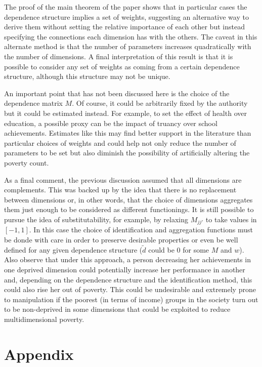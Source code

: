 \documentclass[english, a4paper,12pt]{article}
\begin{document}
The proof of the main theorem of the paper shows that in particular cases the dependence structure implies a set of weights, suggesting an alternative way to derive them without setting the relative importance of each other but instead specifying the connections each dimension has with the others. The caveat in this alternate method is that the number of parameters increases quadratically with the number of dimensions. A final interpretation of this result is that it is possible to consider any set of weights as coming from a certain dependence structure, although this structure may not be unique.

An important point that has not been discussed here is the choice of the dependence matrix $M$. Of course, it could be arbitrarily fixed by the authority but it could be estimated instead. For example, to set the effect of health over education, a possible proxy can be the impact of truancy over school achievements. Estimates like this may find better support in the literature than particular choices of weights and could help not only reduce the number of parameters to be set but also diminish the possibility of artificially altering the poverty count.

As a final comment, the previous discussion assumed that all dimensions are complements. This was backed up by the idea that there is no replacement between dimensions or, in other words, that the choice of dimensions aggregates them just enough to be considered as different functionings. It is still possible to pursue the idea of substitutability, for example, by relaxing $M_{jj'}$ to take values in $[-1,1]$. In this case the choice of identification and aggregation functions must be donde with care in order to preserve desirable properties or even be well defined for any given dependence structure ($\tilde{d}$ could be 0 for some $M$ and $w$). Also observe that under this approach, a person decreasing her achievements in one deprived dimension could potentially increase her performance in another and, depending on the dependence structure and the identification method, this could also rise her out of poverty. This could be undesirable and extremely prone to manipulation if the poorest (in terms of income) groups in the society turn out to be non-deprived in some dimensions that could be exploited to reduce multidimensional poverty.


\newpage
\appendix
\renewcommand{\thesubsection}{\Alph{subsection}}

\section*{Appendix}
\end{document}
